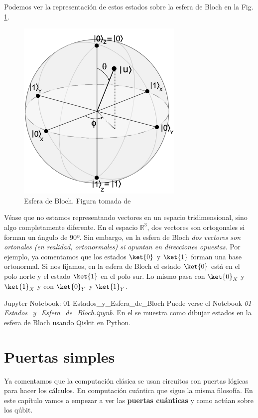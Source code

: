\documentclass[a4paper,11pt]{book} %
\numberwithin{equation}{chapter}
\begin{document}
Podemos ver la representación de estos estados sobre la esfera de Bloch en la Fig. \ref{Fig_qubit_BlochSphere}. 




	\begin{figure}[H]
	\centering 
	\includegraphics[width=0.3\linewidth]{Figuras/Fig_qubit_BlochSphere.png}
	\caption{Esfera de Bloch. Figura tomada de \cite{Curso-JMas}}
	\label{Fig_qubit_BlochSphere}
	\end{figure}
	
	Véase que no estamos representando vectores en un espacio tridimensional, sino algo completamente diferente. En el espacio $\mathbb{R}^3$, dos vectores son ortogonales si forman un ángulo de 90º. Sin embargo, en la esfera de Bloch \textit{dos vectores son ortonales (en realidad, ortonormales) si apuntan en direcciones opuestas}. Por ejemplo, ya comentamos que los estados $\ket{0}$ y $\ket{1}$ forman una base ortonormal. Si nos fijamos, en la esfera de Bloch el estado $\ket{0}$ está en el polo norte y el estado $\ket{1}$ en el polo sur. Lo mismo pasa con $\ket{0}_X$ y $\ket{1}_X$ y con $\ket{0}_Y$ y $\ket{1}_Y$.

        
    \begin{mybox_orange}{Jupyter Notebook: 01-Estados\_y\_Esfera\_de\_Bloch}
    Puede verse el Notebook \textit{01-Estados\_y\_Esfera\_de\_Bloch.ipynb}. En el se muestra como dibujar estados en la esfera de Bloch usando 
    Qiskit en Python.
    \end{mybox_orange}




\chapter{Puertas simples}

	Ya comentamos que la computación clásica se usan circuitos con puertas lógicas para hacer los cálculos. En computación cuántica que sigue la misma filosofía. En este capítulo vamos a empezar a ver las \textbf{puertas cuánticas} y como actúan sobre los qúbit.
	 
\end{document}
